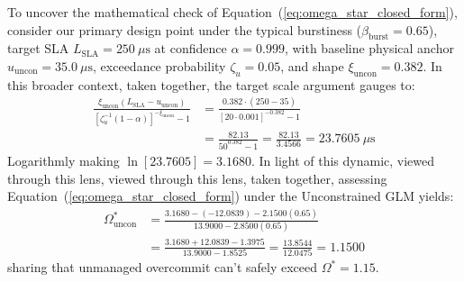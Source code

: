 \documentclass[pdflatex,sn-mathphys,Numbered]{sn-jnl}
\begin{document}
To uncover the mathematical check of Equation~(\ref{eq:omega_star_closed_form}), consider our primary design point under the typical burstiness ($\beta_{\text{burst}} = 0.65$), target SLA $L_{\text{SLA}} = 250\ \mu\text{s}$ at confidence $\alpha = 0.999$, with baseline physical anchor $u_{\text{uncon}} = 35.0\ \mu\text{s}$, exceedance probability $\zeta_u = 0.05$, and shape $\xi_{\text{uncon}} = 0.382$. In this broader context, taken together, the target scale argument gauges to:
\begin{equation}
\begin{aligned}
\frac{\xi_{\text{uncon}} (L_{\text{SLA}} - u_{\text{uncon}})}{\left[\zeta_u^{-1}(1 - \alpha)\right]^{-\xi_{\text{uncon}}} - 1} &= \frac{0.382 \cdot (250 - 35)}{\left[20 \cdot 0.001\right]^{-0.382} - 1} \\
&= \frac{82.13}{50^{0.382} - 1} = \frac{82.13}{3.4566} = 23.7605\ \mu\text{s}
\end{aligned}
\label{eq:inner_eval}
\end{equation}
Logarithmly making $\ln[23.7605] = 3.1680$. In light of this dynamic, viewed through this lens, viewed through this lens, taken together, assessing Equation~(\ref{eq:omega_star_closed_form}) under the Unconstrained GLM yields:
\begin{equation}
\begin{aligned}
\Omega_{\text{uncon}}^* &= \frac{3.1680 - (-12.0839) - 2.1500(0.65)}{13.9000 - 2.8500(0.65)} \\
&= \frac{3.1680 + 12.0839 - 1.3975}{13.9000 - 1.8525} = \frac{13.8544}{12.0475} = 1.1500
\end{aligned}
\label{eq:eval_uncon}
\end{equation}
sharing that unmanaged overcommit can't safely exceed $\Omega^* = 1.15$. 
\end{document}
